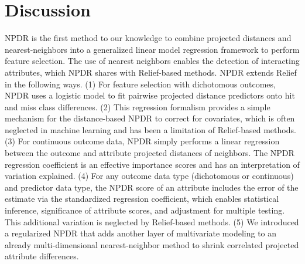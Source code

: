 \documentclass{bioinfo}
\begin{document}
\section{Discussion}
NPDR is the first method to our knowledge to combine projected distances and nearest-neighbors into a generalized linear model regression framework to perform feature selection.
The use of nearest neighbors enables the detection of interacting attributes, which NPDR shares with Relief-based methods. NPDR extends Relief in the following ways.
(1) For feature selection with dichotomous outcomes, NPDR uses a logistic model to fit pairwise projected distance predictors onto hit and miss class differences.
(2) This regression formalism provides a simple mechanism for the distance-based NPDR to correct for covariates, which is often neglected in machine learning and has been a limitation of Relief-based methods.
(3) For continuous outcome data, NPDR simply performs a linear regression between the outcome and attribute projected distances of neighbors. The NPDR regression coefficient is an effective importance scores and has an interpretation of variation explained.
(4) For any outcome data type (dichotomous or continuous) and predictor data type, the NPDR score of an attribute includes the error of the estimate via the standardized regression coefficient, which enables statistical inference, significance of attribute scores, and adjustment for multiple testing. This additional variation is neglected by Relief-based methods.
(5) We introduced a regularized NPDR that adds another layer of multivariate modeling to an already multi-dimensional nearest-neighbor method to shrink correlated projected attribute differences.

\end{document}
